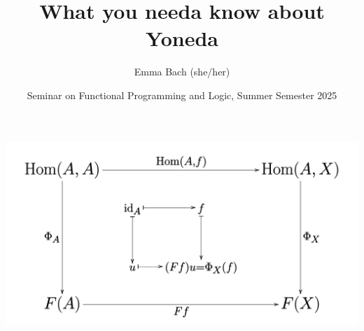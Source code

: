 \documentclass[aspectratio=169]{beamer} %
\title{What you needa know about Yoneda}
\author{Emma Bach (she/her)}
\date{Seminar on Functional Programming and Logic, Summer Semester 2025}
\begin{document}

\begin{frame}[plain]
    \includegraphics[width=0.4\paperwidth]{figures/Yoneda_lemma_cd.svg.png}
    \titlepage
\end{frame}






\end{document}
